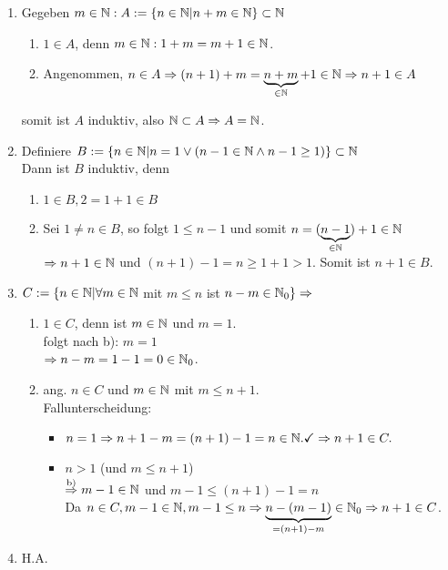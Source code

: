 \documentclass[../ana1.tex]{subfiles}
\begin{document}
\begin{bew}\leavevmode
	\begin{enumerate}
		\item Gegeben \(m\in\mathbb{N}: A :=\{n\in \mathbb{N} | n+m\in \mathbb{N} \} \subset \mathbb{N} \) \\
			\begin{enumerate}
				\item \(1\in A\), denn \(m\in\mathbb{N}: 1+m = m+1\in\mathbb{N} \).
				\item Angenommen, \(n\in A \Rightarrow (n+1) + m = \underbrace{n+m}_{\in\mathbb{N}} + 1 \in\mathbb{N} \\
					\Rightarrow n+1\in A\)
			\end{enumerate} somit ist \(A\) induktiv, also \( \mathbb{N}\subset A \Rightarrow A = \mathbb{N} \).
		\item Definiere \(B:= \{n\in \mathbb{N} |n=1 \vee (n-1\in\mathbb{N}\wedge n-1\geq 1)\} \subset \mathbb{N} \) \\
			Dann ist \(B\) induktiv, denn
			\begin{enumerate}
				\item \(1\in B, 2=1+1\in B\)
				\item Sei \(1\neq n\in B\), so folgt \(1\leq n-1\) und somit \(n=(\underbrace{n-1}_{\in\mathbb{N}}) +1\in\mathbb{N} \) \\
					\( \Rightarrow n+1\in\mathbb{N} \) und \((n+1)-1=n\geq 1+1>1\).
					Somit ist \(n+1\in B\).
			\end{enumerate}
		\item \(C:= \{n\in \mathbb{N} | \forall m \in \mathbb{N} \) mit \(m\leq n\) ist \(n-m\in \mathbb{N}_0\}\Rightarrow \)
			\begin{enumerate}
				\item \(1\in C\), denn ist \(m\in \mathbb{N} \) und \(m=1\).\\
					folgt nach b): \(m=1\) \\
					\(\Rightarrow n - m = 1 - 1 = 0\in \mathbb{N}_0\).
				\item ang. \(n\in C\) und \(m\in\mathbb{N} \) mit \(m\leq n+1\).\\
					Fallunterscheidung:
					\begin{itemize}
						\item \(n=1 \Rightarrow n+1-m=(n+1)-1=n\in\mathbb{N}.\checkmark \\
							\Rightarrow n+1\in C.\)
						\item \(n > 1\) (und \(m \leq n+1\))\\
							\(\overset{\text{b)}}{\Rightarrow} m-1\in \mathbb{N} \) und \(m-1 \leq (n+1)-1 = n\) \\
							Da \(n\in C, m-1\in\mathbb{N}, m-1\leq n \Rightarrow \underbrace{n-(m-1)}_{=(n+1)-m} \in \mathbb{N}_0\\
							\Rightarrow n+1\in C\).
					\end{itemize}
			\end{enumerate}
		\item H.A.
	\end{enumerate}
\end{bew}
\end{document}
